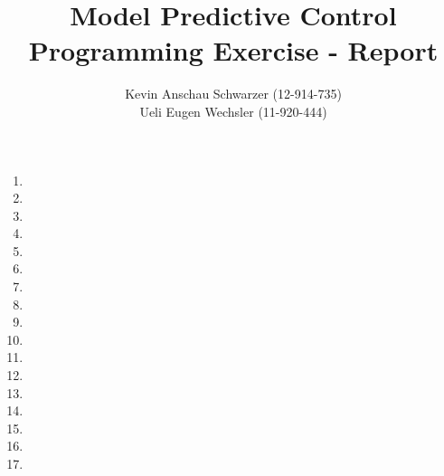 \documentclass[12pt]{article}
\begin{document}
 
 
 
\title{Model Predictive Control\\
    Programming Exercise - Report} %
\author{Kevin Anschau Schwarzer (12-914-735)\\
    Ueli Eugen Wechsler (11-920-444)} %

\maketitle

\begin{enumerate}
    \item
    \item
    \item
    \item
    \item
    \item
    \item
    \item
    \item
    \item
    \item
    \item
    \item
    \item
    \item
    \item
    \item
\end{enumerate}
\end{document}
